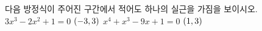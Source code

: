 다음 방정식이 주어진 구간에서 적어도 하나의 실근을 가짐을 보이시오.
 $3x^3-2x^2+1=0$ \quad $(-3{,}\mkern3mu\mathopen{}3)$
 $x^4+x^3-9x+1=0$ \quad $(1{,}\mkern3mu\mathopen{}3)$
